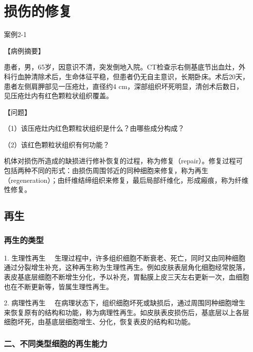 \chapter{损伤的修复}

\begin{framed}
{案例2-1}

{【病例摘要】}

患者，男，65岁，因意识不清，突发倒地入院。CT检查示右侧基底节出血灶，外科行血肿清除术后，生命体征平稳，但患者仍无自主意识，长期卧床。术后20天，患者左侧肩胛部见一压疮灶，直径约4
cm，深部组织坏死明显，清创术后数日，见压疮灶内有红色颗粒状组织覆盖。

{【问题】}

（1）该压疮灶内红色颗粒状组织是什么？由哪些成分构成？

（2）该红色颗粒状组织有何功能？
\end{framed}
机体对损伤所造成的缺损进行修补恢复的过程，称为修复（repair）。修复过程可包括两种不同的形式：由损伤周围邻近的同种细胞来修复，称为再生（regeneration）；由纤维结缔组织来修复，最后局部纤维化，形成瘢痕，称为纤维性修复。

\section{再生}

\subsection{再生的类型}

{1. 生理性再生}
　生理过程中，许多组织细胞不断衰老、死亡，同时又由同种细胞通过分裂增生补充，这种再生称为生理性再生。例如皮肤表层角化细胞经常脱落，表皮基底层细胞不断增生分化，予以补充，胃黏膜上皮三天左右更新一次，血细胞也在不断更新等，皆属生理性再生。

{2. 病理性再生}
　在病理状态下，组织细胞坏死或缺损后，通过周围同种细胞增生来恢复原有的结构和功能，称为病理性再生。如皮肤表皮损伤后，基底层以上各层细胞坏死，由基底层细胞增生、分化，恢复表皮的结构和功能。

\subsection{二、不同类型细胞的再生能力}

